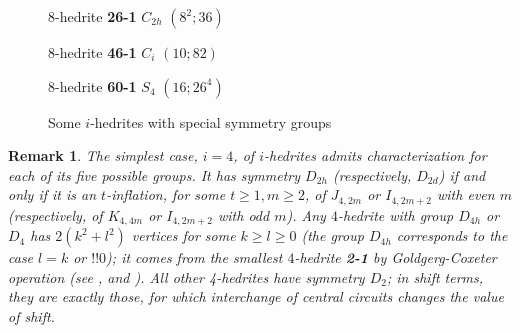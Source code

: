 \documentclass[12pt]{article}
\newtheorem{remark}{Remark}
\begin{document}
\begin{figure}
{\begin{minipage}[t]{4cm}
\epsfxsize=4cm
\par
{$8$-hedrite {\bf 26-1} $C_{2h}$ $(8^2; 36)$}
\end{minipage}
\setlength{\unitlength}{1cm}
\begin{minipage}[t]{4cm}
\centering
\epsfxsize=4cm
\par
{$8$-hedrite {\bf 46-1} $C_i$ $(10; 82)$}
\end{minipage}
\begin{minipage}[t]{4cm}
\centering
\epsfxsize=4cm
\par
{$8$-hedrite {\bf 60-1} $S_4$ $(16;26^4)$}
\end{minipage}
}
\caption{Some $i$-hedrites with special symmetry groups}
\label{special-i-hedrites}
\end{figure}








\begin{remark}
The simplest case, $i=4$, of $i$-hedrites admits characterization for each of
its five possible groups.
It has symmetry $D_{2h}$  (respectively, $D_{2d}$) if and only if it is an
$t$-inflation, for some $t \ge 1, m \ge 2$, of $J_{4,2m}$ or $I_{4,2m+2}$
with even $m$ (respectively, of $K_{4,4m}$ or $I_{4,2m+2}$ with odd $m$).
Any $4$-hedrite with group $D_{4h}$ or $D_4$ has $2(k^2+l^2)$ vertices for
some $k \ge l \ge 0$ (the group $D_{4h}$ corresponds to the case 
$l=k$ or $!!0$);
it comes from the smallest $4$-hedrite {\bf 2-1} by Goldgerg-Coxeter
operation (see \cite{Gold37}, \cite{Cox71} and \cite{DD03}).
All other 4-hedrites have symmetry $D_2$; in shift terms, they are exactly those, for which interchange of central circuits changes the value of shift.
\end{remark}
\end{document}
